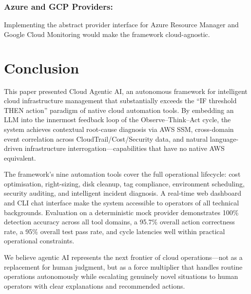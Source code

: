 \documentclass{ieeeaccess}
\begin{document}
\subsubsection{Azure and GCP Providers:} Implementing the abstract provider interface
for Azure Resource Manager and Google Cloud Monitoring would make the framework
cloud-agnostic.

\section{Conclusion}
\label{sec:conclusion}

This paper presented Cloud Agentic AI, an autonomous framework for intelligent
cloud infrastructure management that substantially exceeds the
``IF threshold THEN action'' paradigm of native cloud automation tools. By
embedding an LLM into the innermost feedback loop of the Observe--Think--Act
cycle, the system achieves contextual root-cause diagnosis via AWS SSM,
cross-domain event correlation across CloudTrail/Cost/Security data, and
natural language-driven infrastructure interrogation---capabilities that have
no native AWS equivalent.

The framework's nine automation tools cover the full operational lifecycle:
cost optimisation, right-sizing, disk cleanup, tag compliance, environment
scheduling, security auditing, and intelligent incident diagnosis. A real-time
web dashboard and CLI chat interface make the system accessible to operators
of all technical backgrounds. Evaluation on a deterministic mock provider
demonstrates 100\% detection accuracy across all tool domains, a 95.7\%
overall action correctness rate, a 95\% overall test pass rate, and cycle
latencies well within practical operational constraints.

We believe agentic AI represents the next frontier of cloud operations---not
as a replacement for human judgment, but as a force multiplier that handles
routine operations autonomously while escalating genuinely novel situations to
human operators with clear explanations and recommended actions.
\end{document}
